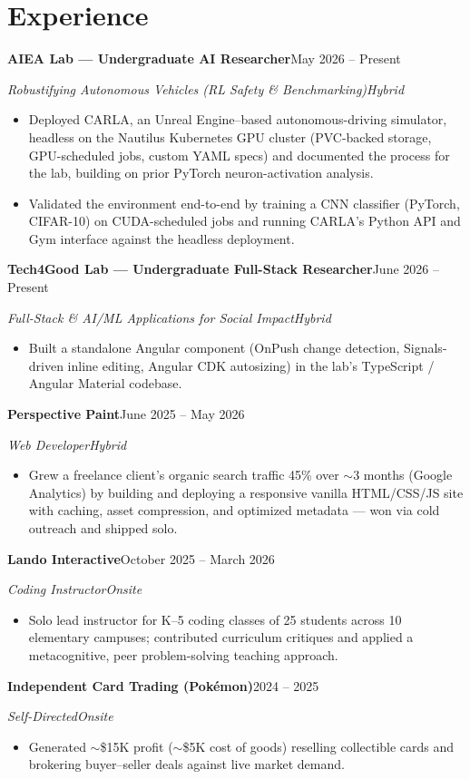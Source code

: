\documentclass[letterpaper,10pt]{article}
\newcommand{\bull}[1]{\item\small{#1}}
\newcommand{\entryTwo}[4]{%
  \vspace{0.5pt}
  {\noindent\textbf{#1}\hfill\textcolor{slate}{\small #2}\par}
  {\noindent\textcolor{slate}{\small\textit{#3}}\hfill\textcolor{slate}{\small\textit{#4}}\par}
  \vspace{-1pt}
}
\begin{document}
\section{Experience}
\entryTwo{AIEA Lab --- Undergraduate AI Researcher}{May 2026 -- Present}{Robustifying Autonomous Vehicles (RL Safety \& Benchmarking)}{Hybrid}
\begin{itemize}
  \bull{Deployed CARLA, an Unreal Engine--based autonomous-driving simulator, headless on the Nautilus Kubernetes GPU cluster (PVC-backed storage, GPU-scheduled jobs, custom YAML specs) and documented the process for the lab, building on prior PyTorch neuron-activation analysis.}
  \bull{Validated the environment end-to-end by training a CNN classifier (PyTorch, CIFAR-10) on CUDA-scheduled jobs and running CARLA's Python API and Gym interface against the headless deployment.}
\end{itemize}

\entryTwo{Tech4Good Lab --- Undergraduate Full-Stack Researcher}{June 2026 -- Present}{Full-Stack \& AI/ML Applications for Social Impact}{Hybrid}
\begin{itemize}
  \bull{Built a standalone Angular component (OnPush change detection, Signals-driven inline editing, Angular CDK autosizing) in the lab's TypeScript / Angular Material codebase.}
\end{itemize}

\entryTwo{Perspective Paint}{June 2025 -- May 2026}{Web Developer}{Hybrid}
\begin{itemize}
  \bull{Grew a freelance client's organic search traffic 45\% over $\sim$3 months (Google Analytics) by building and deploying a responsive vanilla HTML/CSS/JS site with caching, asset compression, and optimized metadata --- won via cold outreach and shipped solo.}
\end{itemize}

\entryTwo{Lando Interactive}{October 2025 -- March 2026}{Coding Instructor}{Onsite}
\begin{itemize}
  \bull{Solo lead instructor for K--5 coding classes of 25 students across 10 elementary campuses; contributed curriculum critiques and applied a metacognitive, peer problem-solving teaching approach.}
\end{itemize}

\entryTwo{Independent Card Trading (Pok\'emon)}{2024 -- 2025}{Self-Directed}{Onsite}
\begin{itemize}
  \bull{Generated $\sim$\$15K profit ($\sim$\$5K cost of goods) reselling collectible cards and brokering buyer--seller deals against live market demand.}
\end{itemize}
\end{document}
